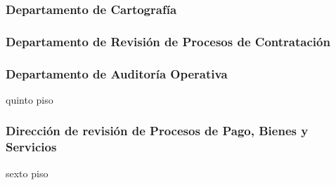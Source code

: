 \subsubsection{Departamento de Cartografía }

\subsubsection{Departamento de Revisión de Procesos de Contratación }

\subsubsection{Departamento de Auditoría Operativa}
 {quinto piso}

\subsubsection{Dirección de revisión de Procesos de Pago, Bienes y Servicios}
 {sexto piso}
